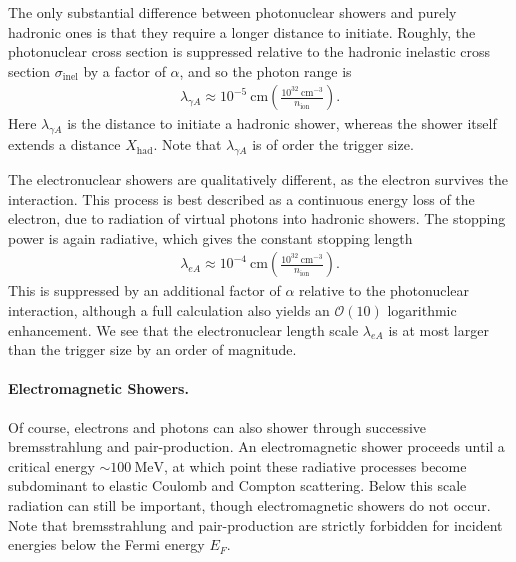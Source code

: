 \documentclass[preprintnumbers,amsmath,amssymb,prd,superscriptaddress]{revtex4}
\newcommand{\OO}{\mathcal{O}}
\newcommand{\MeV}{\text{MeV}}
\def\r{\right)}
\def\l{\left(}
\begin{document}
The only substantial difference between photonuclear showers and purely hadronic ones is that they require a longer distance to initiate.
Roughly, the photonuclear cross section is suppressed relative to the hadronic inelastic cross section $\sigma_\text{inel}$ by a factor of $\alpha$, and so the photon range is
\begin{align}
\label{eq:photonuclength}
  \lambda_{\gamma A} \approx 10^{-5} ~\text{cm} \l\frac{10^{32}~\text{cm}^{-3}}{n_\text{ion}}\r.
\end{align}
Here $\lambda_{\gamma A}$ is the distance to initiate a hadronic shower, whereas the shower itself extends a distance $X_\text{had}$.
Note that $\lambda_{\gamma A}$ is of order the trigger size.

The electronuclear showers are qualitatively different, as the electron survives the interaction.
This process is best described as a continuous energy loss of the electron, due to radiation of virtual photons into hadronic showers.
The stopping power is again radiative, which gives the constant stopping length
\begin{align}
\label{eq:electronuclength}
  \lambda_{eA}
  \approx 10^{-4} ~\text{cm} \l\frac{10^{32}~\text{cm}^{-3}}{n_\text{ion}}\r.
\end{align}
This is suppressed by an additional factor of $\alpha$ relative to the photonuclear interaction, although a full calculation also yields an $\OO(10)$ logarithmic enhancement.
We see that the electronuclear length scale $\lambda_{eA}$ is at most larger than the trigger size by an order of magnitude.

\paragraph{Electromagnetic Showers.}
Of course, electrons and photons can also shower through successive bremsstrahlung and pair-production.
An electromagnetic shower proceeds until a critical energy $\sim 100 ~\MeV$, at which point these radiative processes become subdominant to elastic Coulomb and Compton scattering.
Below this scale radiation can still be important, though electromagnetic showers do not occur.
Note that bremsstrahlung and pair-production are strictly forbidden for incident energies below the Fermi energy $E_F$.
\end{document}

